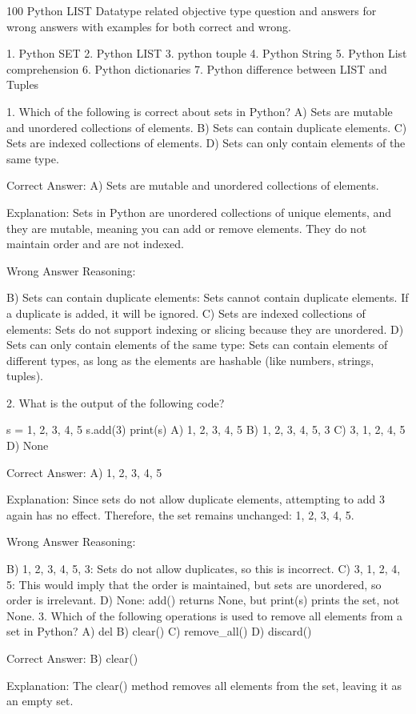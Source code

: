 
100 Python LIST Datatype related objective type question and answers for wrong 
answers with examples for both correct and wrong.

1. Python SET 
2. Python LIST
3. python touple
4. Python String  
5. Python List comprehension
6. Python dictionaries 
7. Python difference between LIST and Tuples

1. Which of the following is correct about sets in Python?
A) Sets are mutable and unordered collections of elements.
B) Sets can contain duplicate elements.
C) Sets are indexed collections of elements.
D) Sets can only contain elements of the same type.

Correct Answer: A) Sets are mutable and unordered collections of elements.

Explanation:
Sets in Python are unordered collections of unique elements, and they are mutable, meaning you can add or remove elements. They do not maintain order and are not indexed.

Wrong Answer Reasoning:

B) Sets can contain duplicate elements: Sets cannot contain duplicate elements. If a duplicate is added, it will be ignored.
C) Sets are indexed collections of elements: Sets do not support indexing or slicing because they are unordered.
D) Sets can only contain elements of the same type: Sets can contain elements of different types, as long as the elements are hashable (like numbers, strings, tuples).

2. What is the output of the following code?

s = {1, 2, 3, 4, 5}
s.add(3)
print(s)
A) {1, 2, 3, 4, 5}
B) {1, 2, 3, 4, 5, 3}
C) {3, 1, 2, 4, 5}
D) None

Correct Answer: A) {1, 2, 3, 4, 5}

Explanation:
Since sets do not allow duplicate elements, attempting to add 3 again has no effect. Therefore, the set remains unchanged: {1, 2, 3, 4, 5}.

Wrong Answer Reasoning:

B) {1, 2, 3, 4, 5, 3}: Sets do not allow duplicates, so this is incorrect.
C) {3, 1, 2, 4, 5}: This would imply that the order is maintained, but sets are unordered, so order is irrelevant.
D) None: add() returns None, but print(s) prints the set, not None.
3. Which of the following operations is used to remove all elements from a set in Python?
A) del
B) clear()
C) remove_all()
D) discard()

Correct Answer: B) clear()

Explanation:
The clear() method removes all elements from the set, leaving it as an empty set.

